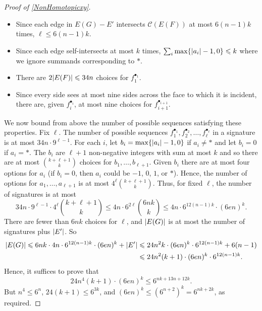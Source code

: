 \documentclass[a4paper,11pt]{article}
\renewcommand{\leq}{\leqslant}
\DeclarePairedDelimiter{\abs}{\lvert}{\rvert} %
\DeclarePairedDelimiter{\set}{\lbrace}{\rbrace} %
\newcommand{\CC}{\mathcal{C}}
\begin{document}
\begin{proof}[Proof of \cref{NonHomotopicxy}]
\begin{itemize}
    \item Since each edge in $E(G) - E'$ intersects $\CC(E(F))$ at most $6(n - 1)k$ times, $\ell \leq 6(n - 1)k$.
    \item Since each edge self-intersects at most $k$ times, $\sum_i \max\set{\abs{a_i} - 1, 0} \leq k$ where we ignore summands corresponding to $\ast$.
    \item There are $2\abs{E(F)} \leq 34n$ choices for $f_1^{\bullet_1}$.
    \item Since every side sees at most nine sides across the face to which it is incident, there are, given $f_i^{\bullet_i}$, at most nine choices for $f_{i + 1}^{\bullet_{i + 1}}$.
\end{itemize}
We now bound from above the number of possible sequences satisfying these properties. Fix $\ell$. The number of possible sequences $f_1^{\bullet_1}, f_2^{\bullet_2}, \dotsc, f_{\ell}^{\bullet_\ell}$ in a signature is at most $34n \cdot 9^{\ell - 1}$. For each $i$, let $b_i = \max\set{\abs{a_i} - 1, 0}$ if $a_i \neq \ast$ and let $b_i = 0$ if $a_i = \ast$. The $b_i$ are $\ell + 1$ non-negative integers with sum at most $k$ and so there are at most $\binom{k + \ell + 1}{k}$ choices for $b_1, \dotsc, b_{\ell + 1}$. Given $b_i$ there are at most four options for $a_i$ (if $b_i = 0$, then $a_i$ could be $-1$, $0$, $1$, or $\ast$). Hence, the number of options for $a_1, \dotsc, a_{\ell + 1}$ is at most $4^{\ell} \binom{k + \ell + 1}{k}$. Thus, for fixed $\ell$, the number of signatures is at most
\begin{equation*}
    34n \cdot 9^{\ell - 1} \cdot 4^{\ell} \binom{k + \ell + 1}{k} \leq 4n \cdot 6^{2\ell} \binom{6nk}{k} \leq 4n \cdot 6^{12(n - 1)k} \cdot (6en)^{k}.
\end{equation*}
There are fewer than $6nk$ choices for $\ell$, and $\abs{E(G)}$ is at most the number of signatures plus $\abs{E'}$. So 
\begin{align*}
    \abs{E(G)} \leq 6nk \cdot 4n \cdot 6^{12(n - 1)k} \cdot (6en)^{k} + \abs{E'} & \leq 24 n^2 k \cdot (6en)^k \cdot 6^{12(n - 1)k} + 6(n - 1) \\
    & \leq 24 n^2 (k + 1) \cdot (6en)^k \cdot 6^{12(n - 1)k}.
\end{align*}
Hence, it suffices to prove that
\begin{equation*}
    24 n^4 (k + 1) \cdot (6en)^k \leq 6^{nk + 13n + 12k}.
\end{equation*}
But $n^4 \leq 6^n$, $24(k + 1) \leq 6^{3k}$, and $(6en)^k \leq (6^{n + 2})^k = 6^{nk + 2k}$, as required.


\end{proof}
\end{document}

